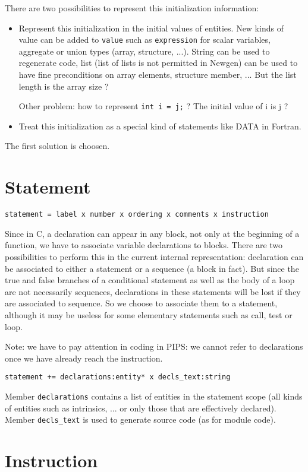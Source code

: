 \documentclass[a4paper]{report}
\begin{document}
There are two possibilities to represent this initialization information:
\begin{itemize}
\item Represent this initialization in the initial values of
entities. New kinds of value can be added to \verb/value/ such as
\verb/expression/ for scalar variables, 
aggregate or union types (array, structure, ...). String can be used to
  regenerate code, list (list of lists is not permitted in Newgen) can be used  to
  have fine preconditions on array elements, structure member, ... But the
  list length is the array size ?

Other problem: how to represent \verb/int i = j;/ ? The initial value of i
is j ?
\item Treat this initialization as a special kind of statements like DATA
  in Fortran. 
\end{itemize}
The first solution is choosen. 

\section{Statement}
\label{statement}
 
\verb/statement = label x number x ordering x comments x instruction/

Since in C, a declaration can appear in any block, not only at the
beginning of a function, we have to associate variable declarations
to blocks. There are two possibilities to perform this in the current internal representation: declaration can be associated to
either a statement or a sequence (a block in fact). But since the true and false branches of a
conditional statement as well as the body of a loop are not necessarily
sequences, declarations in these statements will be lost if
they are associated to sequence. So we choose to associate them to
a statement, although it may be useless for some elementary statements such
as call, test or loop. 

Note: we have to pay attention in coding in
PIPS: we cannot refer to declarations once we have already reach the
instruction.   

\verb/statement += declarations:entity* x decls_text:string/

Member \verb/declarations/ contains a list of entities in the statement
scope (all kinds of entities such as intrinsics, ... or only those that
are effectively declared).  Member \verb/decls_text/ is used to generate source code (as for module code).

\section{Instruction}
\end{document}
